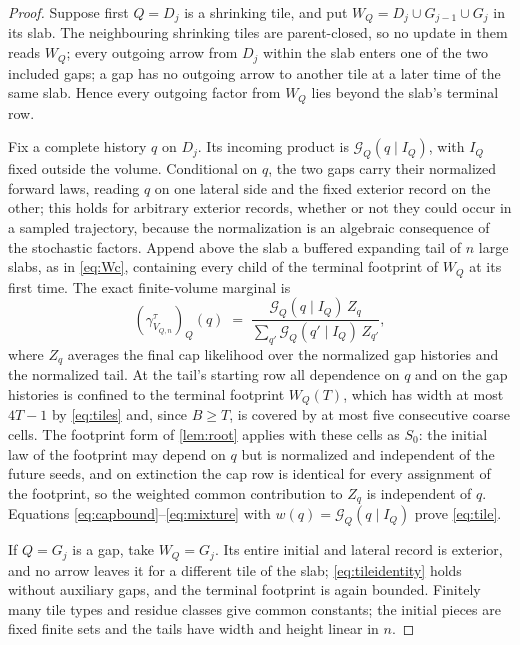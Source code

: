 \documentclass[11pt]{article}
\theoremstyle{plain}
\theoremstyle{definition}
\theoremstyle{remark}
\begin{document}
\begin{proof}
Suppose first $Q=D_j$ is a shrinking tile, and put $W_Q=D_j\cup G_{j-1}\cup G_j$ in its slab. The neighbouring shrinking tiles are parent-closed, so no update in them reads $W_Q$; every outgoing arrow from $D_j$ within the slab enters one of the two included gaps; a gap has no outgoing arrow to another tile at a later time of the same slab. Hence every outgoing factor from $W_Q$ lies beyond the slab's terminal row.

Fix a complete history $q$ on $D_j$. Its incoming product is $\mathcal G_Q(q\mid I_Q)$, with $I_Q$ fixed outside the volume. Conditional on $q$, the two gaps carry their normalized forward laws, reading $q$ on one lateral side and the fixed exterior record on the other; this holds for arbitrary exterior records, whether or not they could occur in a sampled trajectory, because the normalization is an algebraic consequence of the stochastic factors. Append above the slab a buffered expanding tail of $n$ large slabs, as in \eqref{eq:Wc}, containing every child of the terminal footprint of $W_Q$ at its first time. The exact finite-volume marginal is
\begin{equation}
(\gamma^\tau_{V_{Q,n}})_Q(q)\;=\;\frac{\mathcal G_Q(q\mid I_Q)\,Z_q}{\sum_{q'}\mathcal G_Q(q'\mid I_Q)\,Z_{q'}},
\label{eq:tileidentity}
\end{equation}
where $Z_q$ averages the final cap likelihood over the normalized gap histories and the normalized tail. At the tail's starting row all dependence on $q$ and on the gap histories is confined to the terminal footprint $W_Q(T)$, which has width at most $4T-1$ by \eqref{eq:tiles} and, since $B\ge T$, is covered by at most five consecutive coarse cells. The footprint form of \cref{lem:root} applies with these cells as $S_0$: the initial law of the footprint may depend on $q$ but is normalized and independent of the future seeds, and on extinction the cap row is identical for every assignment of the footprint, so the weighted common contribution to $Z_q$ is independent of $q$. Equations \eqref{eq:capbound}--\eqref{eq:mixture} with $w(q)=\mathcal G_Q(q\mid I_Q)$ prove \eqref{eq:tile}.

If $Q=G_j$ is a gap, take $W_Q=G_j$. Its entire initial and lateral record is exterior, and no arrow leaves it for a different tile of the slab; \eqref{eq:tileidentity} holds without auxiliary gaps, and the terminal footprint is again bounded. Finitely many tile types and residue classes give common constants; the initial pieces are fixed finite sets and the tails have width and height linear in $n$.
\end{proof}
\end{document}

